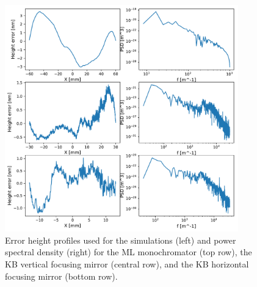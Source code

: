\documentclass{iucr}              %
\newcommand{\todo}[1]{{\color{red}[TODO: "#1'']}}
\begin{document}
\begin{figure}\label{fig:metrology}
\includegraphics[width=0.9\textwidth]{GRAPHICS/metrology.pdf}
\caption{Error height profiles used for the simulations (left) and power spectral density (right) for the ML monochromator (top row), the KB vertical focusing mirror (central row), and the KB horizontal focusing mirror (bottom row).}
\end{figure}





\end{document}

